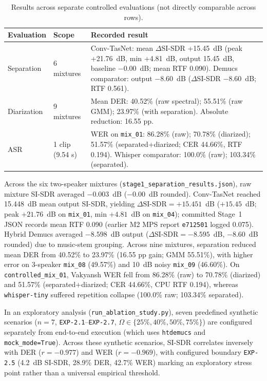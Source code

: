 \documentclass[11pt,a4paper,twocolumn]{article}
\begin{document}
\begin{table}[t]
\centering
\small
\begin{tabularx}{\textwidth}{@{}l l X@{}}
\toprule
Evaluation & Scope & Recorded result \\
\midrule
Separation & 6 mixtures & Conv-TasNet: mean $\Delta$SI-SDR +15.45~dB (peak +21.76~dB, min +4.81~dB, output 15.45~dB, baseline $-0.00$~dB; mean RTF 0.090). Demucs comparator: output $-8.60$~dB ($\Delta$SI-SDR $-8.60$~dB; RTF 0.561). \\
Diarization & 9 mixtures & Mean DER: 40.52\% (raw spectral); 55.51\% (raw GMM); 23.97\% (with separation). Absolute reduction: 16.55 pp. \\
ASR & 1 clip (9.54 s) & WER on \texttt{mix\_01}: 86.28\% (raw); 70.78\% (diarized); 51.57\% (separated+diarized; CER 44.66\%, RTF 0.194). Whisper comparator: 100.0\% (raw); 103.34\% (separated). \\
\bottomrule
\end{tabularx}
\caption{Results across separate controlled evaluations (not directly comparable across rows).}
\label{tab:results}
\end{table}

Across the six two-speaker mixtures (\texttt{stage1\_separation\_results.json}), raw mixture SI-SDR averaged $-0.003$~dB ($-0.00$~dB rounded). Conv-TasNet reached 15.448~dB mean output SI-SDR, yielding $\Delta\text{SI-SDR} = +15.451$~dB ($+15.45$~dB; peak $+21.76$~dB on \texttt{mix\_01}, min $+4.81$~dB on \texttt{mix\_04}); committed Stage~1 JSON records mean RTF 0.090 (earlier M2 MPS report \texttt{e712501} logged 0.075). Hybrid Demucs averaged $-8.598$~dB output ($\Delta\text{SI-SDR} = -8.595$~dB, $-8.60$~dB rounded) due to music-stem grouping. Across nine mixtures, separation reduced mean DER from 40.52\% to 23.97\% (16.55 pp gain; GMM 55.51\%), with higher error on 3-speaker \texttt{mix\_08} (49.57\%) and 10~dB noisy \texttt{mix\_09} (46.60\%). On \texttt{controlled\_mix\_01}, Vakyansh WER fell from 86.28\% (raw) to 70.78\% (diarized) and 51.57\% (separated+diarized; CER 44.66\%, CPU RTF 0.194), whereas \texttt{whisper-tiny} suffered repetition collapse (100.0\% raw; 103.34\% separated).

In an exploratory analysis (\texttt{run\_\allowbreak ablation\_\allowbreak study.py}), seven predefined synthetic scenarios ($n=7$, \texttt{EXP-2.1}--\texttt{EXP-2.7}, $\Omega \in \{25\%, 40\%, 50\%, 75\%\}$) are configured separately from end-to-end execution (which uses \texttt{htdemucs} and \texttt{mock\_mode=True}). Across these synthetic scenarios, SI-SDR correlates inversely with DER ($r = -0.977$) and WER ($r = -0.969$), with configured boundary \texttt{EXP-2.5} (4.2~dB SI-SDR, 28.9\% DER, 42.7\% WER) marking an exploratory stress point rather than a universal empirical threshold.
\end{document}
